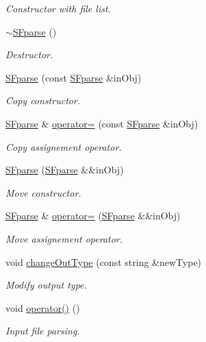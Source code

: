 \begin{DoxyCompactItemize}
\begin{DoxyCompactList}\small\item\em Constructor with file list. \end{DoxyCompactList}\item 
\mbox{\label{class_s_fparse_a197d31f86dd544159fc8d8d79e36aaaf}} 
\hyperlink{class_s_fparse_a197d31f86dd544159fc8d8d79e36aaaf}{$\sim$\+S\+Fparse} ()
\begin{DoxyCompactList}\small\item\em Destructor. \end{DoxyCompactList}\item 
\hyperlink{class_s_fparse_ae85a63a8883ec1c318cabdcb30398063}{S\+Fparse} (const \hyperlink{class_s_fparse}{S\+Fparse} \&in\+Obj)
\begin{DoxyCompactList}\small\item\em Copy constructor. \end{DoxyCompactList}\item 
\hyperlink{class_s_fparse}{S\+Fparse} \& \hyperlink{class_s_fparse_a5f7e978d765c8fb8735526fac38a301f}{operator=} (const \hyperlink{class_s_fparse}{S\+Fparse} \&in\+Obj)
\begin{DoxyCompactList}\small\item\em Copy assignement operator. \end{DoxyCompactList}\item 
\hyperlink{class_s_fparse_a9c3e1e6f6f687ecf61f046e1bcf5b61c}{S\+Fparse} (\hyperlink{class_s_fparse}{S\+Fparse} \&\&in\+Obj)
\begin{DoxyCompactList}\small\item\em Move constructor. \end{DoxyCompactList}\item 
\hyperlink{class_s_fparse}{S\+Fparse} \& \hyperlink{class_s_fparse_afde939079361531d7373ee8c0dc75151}{operator=} (\hyperlink{class_s_fparse}{S\+Fparse} \&\&in\+Obj)
\begin{DoxyCompactList}\small\item\em Move assignement operator. \end{DoxyCompactList}\item 
void \hyperlink{class_s_fparse_aafdccb9f01902b2081e6891ccfc8bd49}{change\+Out\+Type} (const string \&new\+Type)
\begin{DoxyCompactList}\small\item\em Modify output type. \end{DoxyCompactList}\item 
void \hyperlink{class_s_fparse_a2efd2115f5a579a4fccd25f9c4270c69}{operator()} ()
\begin{DoxyCompactList}\small\item\em Input file parsing. \end{DoxyCompactList}\end{DoxyCompactItemize}


